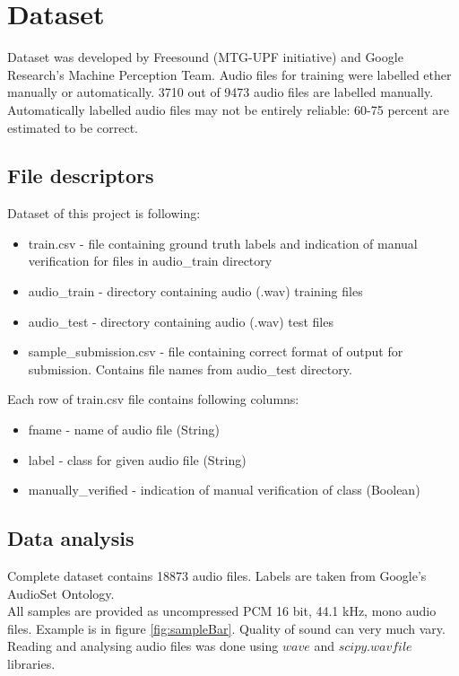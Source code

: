 \documentclass{article}
\begin{document}
\section{Dataset}
Dataset was developed by Freesound (MTG-UPF initiative) and Google Research’s Machine Perception Team.
Audio files for training were labelled ether manually or automatically. 3710 out of 9473 audio files are labelled
manually. Automatically labelled audio files may not be entirely reliable: 60-75 percent are estimated
to be correct.\\

\subsection{File descriptors}
Dataset of this project is following:
\begin{itemize}
 \item train.csv - file containing ground truth labels and indication of manual verification for 
  files in audio\_train directory
 \item audio\_train - directory containing audio (.wav) training files
 \item audio\_test - directory containing audio (.wav) test files
 \item sample\_submission.csv - file containing correct format of output for submission. 
  Contains file names from audio\_test directory.
\end{itemize}
Each row of train.csv file contains following columns:
\begin{itemize}
 \item fname - name of audio file (String)
 \item label - class for given audio file (String)
 \item manually\_verified - indication of manual verification of class (Boolean)
\end{itemize}

\subsection{Data analysis}
Complete dataset contains 18873 audio files. Labels are taken from Google's AudioSet Ontology.\\
All samples are provided as uncompressed PCM 16 bit, 44.1 kHz, mono audio files. Example is in  figure
\ref{fig:sampleBar}. Quality of sound can very much vary.\\
Reading and analysing audio files was done using $wave$ and $scipy.wavfile$ libraries.\\
\end{document}
